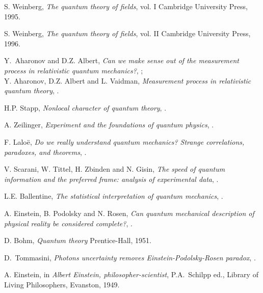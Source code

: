 \documentclass[published]{JHEP3}
\begin{document}
\begin{thebibliography}{99}




S. Weinberg, \emph{The quantum theory of fields}, vol. I Cambridge
University Press, 1995.


S. Weinberg, \emph{The quantum theory of fields}, vol. II Cambridge
University Press, 1996.


Y.~Aharonov and D.Z. Albert, \emph{Can we make sense out of the
  measurement process in relativistic quantum mechanics?},
  ;\\
Y. Aharonov, D.Z. Albert and L. Vaidman, \emph{Measurement process in
relativistic quantum theory}, .


H.P. Stapp, \emph{Nonlocal character of quantum theory},
.


A. Zeilinger, \emph{Experiment and the foundations of quantum
physics}, .


F. Lalo\"e, \emph{Do we really understand quantum mechanics? Strange
correlations, paradoxes, and theorems}, .

V. Scarani, W. Tittel, H. Zbinden and N. Gisin, \emph{The speed of
quantum information and the preferred frame: analysis of experimental
data}, \pla{276}{2000}{1}.


L.E. Ballentine, \emph{The statistical interpretation of quantum
mechanics}, \rmp{42}{1970}{358}.


A. Einstein, B. Podolsky and N. Rosen, \emph{Can quantum mechanical
description of physical reality be considered complete?},
.


D. Bohm, \emph{Quantum theory} Prentice-Hall, 1951.


D.~Tommasini, \emph{Photons uncertainty removes
  Einstein-Podolsky-Rosen paradox}, .



A. Einstein, in \emph{Albert Einstein, philosopher-scientist},
P.A.~Schilpp ed., Library of Living Philosophers, Evanston, 1949.



\end{thebibliography}
\end{document}
